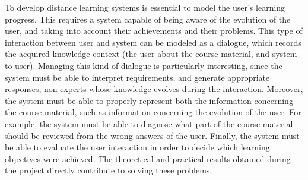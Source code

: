 
To develop distance learning systems is essential to model the user's learning
progress. This requires a system capable of being aware of the evolution of the
user, and taking into account their achievements and their problems. This type
of interaction between user and system can be modeled as a dialogue, which
records the acquired knowledge context (the user about the course material, and
system to user). Managing this kind of dialogue is particularly interesting,
since the system must be able to interpret requirements, and generate
appropriate responses, non-experts whose knowledge evolves during the
interaction. Moreover, the system must be able to properly represent both the
information concerning the course material, such as information concerning the
evolution of the user. For example, the system must be able to diagnose what
part of the course material should be reviewed from the wrong answers of the
user. Finally, the system must be able to evaluate the user interaction in order
to decide which learning objectives were achieved. The theoretical and practical
results obtained during the project directly contribute to solving these
problems.


